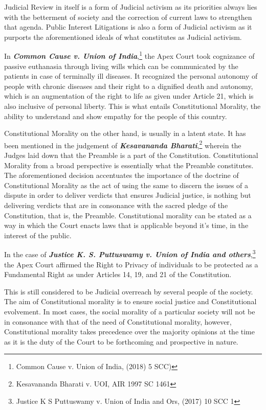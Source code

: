 \begin{multicols}{2}
\noi
Judicial Review in itself is a form of Judicial activism as its priorities always lies with the
betterment of society and the correction of current laws to strengthen that agenda. Public Interest Litigations is also a form of Judicial activism as it purports the aforementioned ideals
of what constitutes as Judicial activism. 

\noi
In \textbf{\textit{Common Cause v. Union of India}},\footnote{Common Cause v. Union of India, (2018) 5 SCC)}  the Apex Court took cognizance of passive
euthanasia through living wills which can be communicated by the patients in case of
terminally ill diseases. It recognized the personal autonomy of people with chronic diseases
and their right to a dignified death and autonomy, which is an augmentation of the right to
life as given under Article 21, which is also inclusive of personal liberty. This is what entails
Constitutional Morality, the ability to understand and show empathy for the people of this
country. 

\noi
Constitutional Morality on the other hand, is usually in a latent state. It has been mentioned in
the judgement of \textbf{\textit{Kesavananda Bharati}},\footnote{Kesavananda Bharati v. UOI, AIR 1997 SC 1461 } wherein the Judges laid down that the Preamble is
a part of the Constitution. Constitutional Morality from a broad perspective is essentially
what the Preamble constitutes. The aforementioned decision accentuates the importance of
the doctrine of Constitutional Morality as the act of using the same to discern the issues of a
dispute in order to deliver verdicts that ensures Judicial justice, is nothing but delivering
verdicts that are in consonance with the sacred pledge of the Constitution, that is, the
Preamble. Constitutional morality can be stated as a way in which the Court enacts laws that
is applicable beyond it’s time, in the interest of the public. 

\noi
In the case of \textbf{\textit{Justice K. S. Puttuswamy v. Union of India and others}},\footnote{Justice K S Puttuswamy v. Union of India and Ors, (2017) 10 SCC 1} the Apex Court
affirmed the Right to Privacy of individuals to be protected as a Fundamental Right as under
Articles 14, 19, and 21 of the Constitution.

\noi
This is still considered to be Judicial overreach by several people of the society. The aim of
Constitutional morality is to ensure social justice and Constitutional evolvement. In most
cases, the social morality of a particular society will not be in consonance with that of the
need of Constitutional morality, however, Constitutional morality takes precedence over the
majority opinions at the time as it is the duty of the Court to be forthcoming and prospective
in nature.


\end{multicols}
